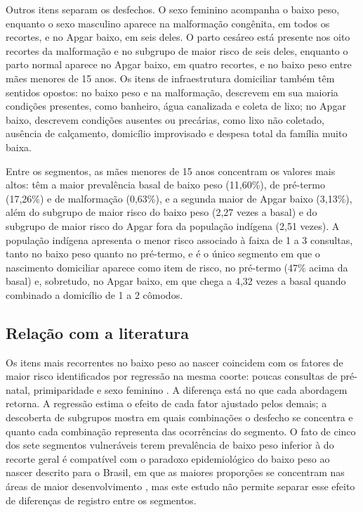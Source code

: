 Outros itens separam os desfechos. O sexo feminino acompanha o baixo peso, enquanto o sexo masculino aparece na malformação congênita, em todos os recortes, e no Apgar baixo, em seis deles. O parto cesáreo está presente nos oito recortes da malformação e no subgrupo de maior risco de seis deles, enquanto o parto normal aparece no Apgar baixo, em quatro recortes, e no baixo peso entre mães menores de 15 anos. Os itens de infraestrutura domiciliar também têm sentidos opostos: no baixo peso e na malformação, descrevem em sua maioria condições presentes, como banheiro, água canalizada e coleta de lixo; no Apgar baixo, descrevem condições ausentes ou precárias, como lixo não coletado, ausência de calçamento, domicílio improvisado e despesa total da família muito baixa.

Entre os segmentos, as mães menores de 15 anos concentram os valores mais altos: têm a maior prevalência basal de baixo peso (11,60\%), de pré-termo (17,26\%) e de malformação (0,63\%), e a segunda maior de Apgar baixo (3,13\%), além do subgrupo de maior risco do baixo peso (2,27 vezes a basal) e do subgrupo de maior risco do Apgar fora da população indígena (2,51 vezes). A população indígena apresenta o menor risco associado à faixa de 1 a 3 consultas, tanto no baixo peso quanto no pré-termo, e é o único segmento em que o nascimento domiciliar aparece como item de risco, no pré-termo (47\% acima da basal) e, sobretudo, no Apgar baixo, em que chega a 4,32 vezes a basal quando combinado a domicílio de 1 a 2 cômodos.

\subsection{Relação com a literatura}\label{subsec:disc-literatura}

Os itens mais recorrentes no baixo peso ao nascer coincidem com os fatores de maior risco identificados por regressão na mesma coorte: poucas consultas de pré-natal, primiparidade e sexo feminino \cite{falcao2020}. A diferença está no que cada abordagem retorna. A regressão estima o efeito de cada fator ajustado pelos demais; a descoberta de subgrupos mostra em quais combinações o desfecho se concentra e quanto cada combinação representa das ocorrências do segmento. O fato de cinco dos sete segmentos vulneráveis terem prevalência de baixo peso inferior à do recorte geral é compatível com o paradoxo epidemiológico do baixo peso ao nascer descrito para o Brasil, em que as maiores proporções se concentram nas áreas de maior desenvolvimento \cite{silva2010}, mas este estudo não permite separar esse efeito de diferenças de registro entre os segmentos.

